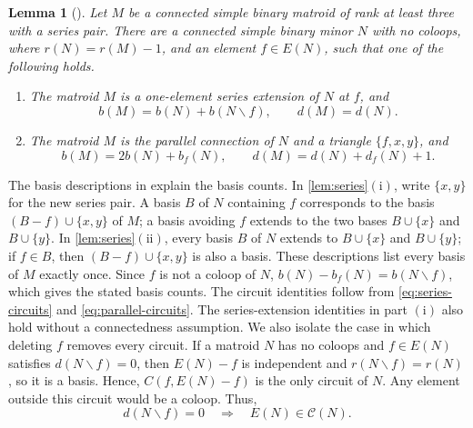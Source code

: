 \documentclass[10pt,a4paper]{article}
\numberwithin{equation}{section}
\newtheorem{lemma}[lemma]{Lemma}
\newcommand{\CC}{\mathcal C}
\begin{document}
\begin{lemma}[{\cite[proof of Theorem~3.1, pp.~177--178]{Oxley1983}}]\label{lem:series}
Let \(M\) be a connected simple binary matroid of rank at least
three with a series pair. There are a connected simple binary minor
\(N\) with no coloops, where \(r(N)=r(M)-1\), and an element
\(f\in E(N)\), such that one of the following holds.
\begin{enumerate}
\item[\(\mathrm{(i)}\)] The matroid \(M\) is a one-element series
extension of \(N\) at \(f\), and
\[
 b(M)=b(N)+b(N\backslash f),\qquad d(M)=d(N).
\]
\item[\(\mathrm{(ii)}\)] The matroid \(M\) is the parallel connection
of \(N\) and a triangle \(\{f,x,y\}\), and
\[
 b(M)=2b(N)+b_f(N),\qquad d(M)=d(N)+d_f(N)+1.
\]
\end{enumerate}
\end{lemma}
The basis descriptions in \cite[Proposition~7.1.13(i),(ii)]{Oxley2011}
explain the basis counts.
In \autoref{lem:series}\(\mathrm{(i)}\), write \(\{x,y\}\) for the new series
pair. A basis \(B\) of \(N\) containing \(f\) corresponds to the basis
\((B-f)\cup\{x,y\}\) of \(M\); a basis avoiding \(f\) extends to the two
bases \(B\cup\{x\}\) and \(B\cup\{y\}\).
In \autoref{lem:series}\(\mathrm{(ii)}\), every basis \(B\) of \(N\) extends to
\(B\cup\{x\}\) and \(B\cup\{y\}\); if \(f\in B\), then
\((B-f)\cup\{x,y\}\) is also a basis. These descriptions list every basis
of \(M\) exactly once.
Since \(f\) is not a coloop of \(N\),
\(b(N)-b_f(N)=b(N\backslash f)\), which gives the stated basis counts.
The circuit identities follow from \eqref{eq:series-circuits}
and \eqref{eq:parallel-circuits}.
The series-extension identities in part \(\mathrm{(i)}\) also hold
without a connectedness assumption.
We also isolate the case in which deleting \(f\) removes every circuit.
If a matroid \(N\) has no coloops and \(f\in E(N)\) satisfies
\(d(N\backslash f)=0\), then \(E(N)-f\) is independent and
\(r(N\backslash f)=r(N)\), so it is a basis.
Hence, \(C(f,E(N)-f)\) is the only circuit of \(N\).
Any element outside this circuit would be a coloop. Thus,
\begin{equation}\label{eq:circuit-case}
 d(N\backslash f)=0\quad\Longrightarrow\quad E(N)\in\CC(N).
\end{equation}
\end{document}
